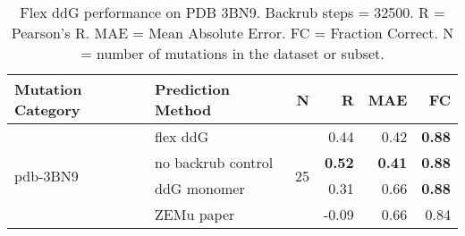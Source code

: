 \begin{table}
  \begin{tabular}{llrrrr}
\toprule
Mutation Category &   Prediction Method &   N &     R &  MAE &   FC \\
\midrule
 \multirow{ 4}{*}{pdb-3BN9} & flex ddG & \multirow{ 4}{*}{25} & 0.44 & 0.42 & \textbf{0.88}  \\
 & no backrub control & & \textbf{0.52} & \textbf{0.41} & \textbf{0.88}  \\
 & ddG monomer & & 0.31 & 0.66 & \textbf{0.88}  \\
 & ZEMu paper & & -0.09 & 0.66 & 0.84  \\
\bottomrule
\end{tabular}
  \caption[Flex ddG performance on PDB 3BN9]{
    Flex ddG performance on PDB 3BN9. Backrub steps = 32500. R = Pearson's R. MAE = Mean Absolute Error. FC = Fraction Correct. N = number of mutations in the dataset or subset.
  } \label{tab:table-pdb-3BN9}
\end{table}
